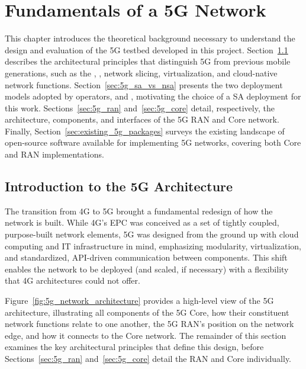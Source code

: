 %

\chapter{Fundamentals of a 5G Network}
\label{cha:5g-fundamentals}
This chapter introduces the theoretical background necessary to understand the design and evaluation of the 5G testbed developed in this project. Section~\ref{sec:introduction_5g_architecture} describes the architectural principles that distinguish 5G from previous mobile generations, such as the , , network slicing, virtualization, and cloud-native network functions. Section~\ref{sec:5g_sa_vs_nsa} presents the two deployment models adopted by operators,  and , motivating the choice of a \gls{SA} deployment for this work. Sections~\ref{sec:5g_ran} and~\ref{sec:5g_core} detail, respectively, the architecture, components, and interfaces of the 5G \gls{RAN} and Core network. Finally, Section~\ref{sec:existing_5g_packages} surveys the existing landscape of open-source software available for implementing 5G networks, covering both Core and \gls{RAN} implementations.

\section{Introduction to the 5G Architecture}
\label{sec:introduction_5g_architecture}
The transition from 4G to 5G brought a fundamental redesign of how the network is built. While 4G's \gls{EPC} was conceived as a set of tightly coupled, purpose-built network elements, 5G was designed from the ground up with cloud computing and IT infrastructure in mind, emphasizing modularity, virtualization, and standardized, API-driven communication between components. This shift enables the network to be deployed (and scaled, if necessary) with a flexibility that 4G architectures could not offer.

Figure~\ref{fig:5g_network_architecture} provides a high-level view of the 5G architecture, illustrating all components of the 5G Core, how their constituent network functions relate to one another, the 5G \gls{RAN}'s position on the network edge, and how it connects to the Core network. The remainder of this section examines the key architectural principles that define this design, before Sections~\ref{sec:5g_ran} and~\ref{sec:5g_core} detail the \gls{RAN} and Core individually.

